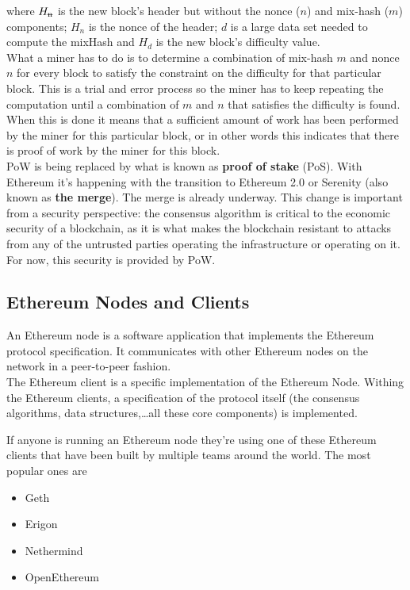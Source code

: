 \qquad where $H_\text{\sout{n}}$ is the new block's header but without the nonce ($n$) and mix-hash ($m$) components; $H_n$ is the nonce of the header; $d$ is a large data set needed to compute the mixHash and $H_d$ is the new block's difficulty value.\\

What a miner has to do is to determine a combination of mix-hash $m$ and nonce $n$ for every block to satisfy the constraint on the difficulty for that particular block.
This is a trial and error process so the miner has to keep repeating the computation until a combination of $m$ and $n$ that satisfies the difficulty is found.
When this is done it means that a sufficient amount of work has been performed by the miner for this particular block, or in other words this indicates that there is proof of work by the miner for this block.\\

PoW is being replaced by what is known as \textbf{proof of stake} (PoS).
With Ethereum it's happening with the transition to Ethereum 2.0 or Serenity (also known as \textbf{the merge}).
The merge is already underway.
This change is important from a security perspective: the consensus algorithm is critical to the economic security of a blockchain, as it is what makes the blockchain resistant to attacks from any of the untrusted parties operating the infrastructure or operating on it.
For now, this security is provided by PoW.

\subsection*{Ethereum Nodes and Clients}

An Ethereum node is a software application that implements the Ethereum protocol specification.
It communicates with other Ethereum nodes on the network in a peer-to-peer fashion.\\

The Ethereum client is a specific implementation of the Ethereum Node.
Withing the Ethereum clients, a specification of the protocol itself (the consensus algorithms, data structures,\dots all these core components) is implemented.

If anyone is running an Ethereum node they're using one of these Ethereum clients that have been built by multiple teams around the world.
The most popular ones are
\begin{itemize}
\item Geth
\item Erigon
\item Nethermind
\item OpenEthereum
\end{itemize}

